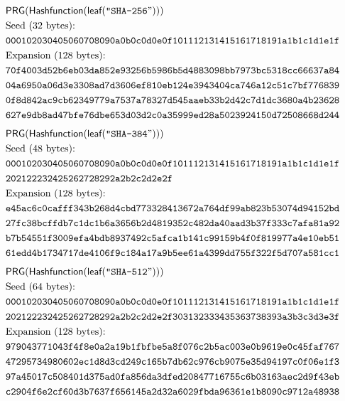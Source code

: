 \begin{align*}
&\textsf{PRG}(\textsf{Hashfunction}(\textsf{leaf}(\texttt{"SHA-256}")))\\
&\textrm{Seed (32 bytes):}\\
&\texttt{000102030405060708090a0b0c0d0e0f101112131415161718191a1b1c1d1e1f}\\
&\textrm{Expansion (128 bytes):}\\
&\texttt{70f4003d52b6eb03da852e93256b5986b5d4883098bb7973bc5318cc66637a84}\\
&\texttt{04a6950a06d3e3308ad7d3606ef810eb124e3943404ca746a12c51c7bf776839}\\
&\texttt{0f8d842ac9cb62349779a7537a78327d545aaeb33b2d42c7d1dc3680a4b23628}\\
&\texttt{627e9db8ad47bfe76dbe653d03d2c0a35999ed28a5023924150d72508668d244}
\end{align*}
\begin{align*}
&\textsf{PRG}(\textsf{Hashfunction}(\textsf{leaf}(\texttt{"SHA-384}")))\\
&\textrm{Seed (48 bytes):}\\
&\texttt{000102030405060708090a0b0c0d0e0f101112131415161718191a1b1c1d1e1f}\\
&\texttt{202122232425262728292a2b2c2d2e2f}\\
&\textrm{Expansion (128 bytes):}\\
&\texttt{e45ac6c0cafff343b268d4cbd773328413672a764df99ab823b53074d94152bd}\\
&\texttt{27fc38bcffdb7c1dc1b6a3656b2d4819352c482da40aad3b37f333c7afa81a92}\\
&\texttt{b7b54551f3009efa4bdb8937492c5afca1b141c99159b4f0f819977a4e10eb51}\\
&\texttt{61edd4b1734717de4106f9c184a17a9b5ee61a4399dd755f322f5d707a581cc1}
\end{align*}
\begin{align*}
&\textsf{PRG}(\textsf{Hashfunction}(\textsf{leaf}(\texttt{"SHA-512}")))\\
&\textrm{Seed (64 bytes):}\\
&\texttt{000102030405060708090a0b0c0d0e0f101112131415161718191a1b1c1d1e1f}\\
&\texttt{202122232425262728292a2b2c2d2e2f303132333435363738393a3b3c3d3e3f}\\
&\textrm{Expansion (128 bytes):}\\
&\texttt{979043771043f4f8e0a2a19b1fbfbe5a8f076c2b5ac003e0b9619e0c45faf767}\\
&\texttt{47295734980602ec1d8d3cd249c165b7db62c976cb9075e35d94197c0f06e1f3}\\
&\texttt{97a45017c508401d375ad0fa856da3dfed20847716755c6b03163aec2d9f43eb}\\
&\texttt{c2904f6e2cf60d3b7637f656145a2d32a6029fbda96361e1b8090c9712a48938}
\end{align*}
